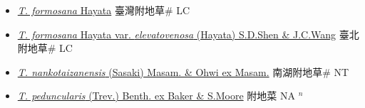 \begin{itemize}
  \begin{itemize}
        \item[] \href{http://www.theplantlist.org/tpl1.1/search?q=Trigonotis+formosana}{\textit{T. formosana} Hayata}   臺灣附地草\# LC
        \item[] \href{http://www.theplantlist.org/tpl1.1/search?q=Trigonotis+formosana+var.+elevatovenosa}{\textit{T. formosana} Hayata var. \textit{elevatovenosa} (Hayata) S.D.Shen \& J.C.Wang}   臺北附地草\# LC
        \item[] \href{http://www.theplantlist.org/tpl1.1/search?q=Trigonotis+nankotaizanensis}{\textit{T. nankotaizanensis} (Sasaki) Masam. \& Ohwi ex Masam.}   南湖附地草\# NT
        \item[] \href{http://www.theplantlist.org/tpl1.1/search?q=Trigonotis+peduncularis}{\textit{T. peduncularis} (Trev.) Benth. ex Baker \& S.Moore}   附地菜 NA $^n$
  \end{itemize}
  \end{itemize}
